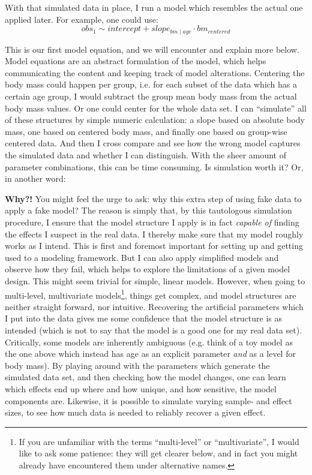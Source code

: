 With that simulated data in place, I run a model which resembles the actual one applied later.
For example, one could use:
\begin{equation} obs_{1} \sim intercept + slope_{bm\mid age} \cdot bm_{centered} \label{eq:exampleformula} \end{equation}

This is our first model equation, and we will encounter and explain more below.
Model equations are an abstract formulation of the model, which helps communicating the content and keeping track of model alterations.
Centering the body mass could happen per group, i.e. for each subset of the data which has a certain age group, I would subtract the group mean body mass from the actual body mass values.
Or one could center for the whole data set.
I can ``simulate'' all of these structures by simple numeric calculation: a slope based on absolute body mass, one based on centered body mass, and finally one based on group-wise centered data.
And then I cross compare and see how the wrong model captures the simulated data and whether I can distinguish.
With the sheer amount of parameter combinations, this can be time consuming.
Is simulation worth it? Or, in another word:

\textbf{Why?!} You might feel the urge to ask: why this extra step of using fake data to apply a fake model?
The reason is simply that, by this tautologous simulation procedure, I ensure that the model structure I apply is in fact \emph{capable of} finding the effects I suspect in the real data.
I thereby make sure that my model roughly works as I intend.
This is first and foremost important for setting up and getting used to a modeling framework.
But I can also apply simplified models and observe how they fail, which helps to explore the limitations of a given model design.
This might seem trivial for simple, linear models.
However, when going to multi-level, multivariate models\footnote{If you are unfamiliar with the terms ``multi-level'' or ``multivariate'', I would like to ask some patience: they will get clearer below, and in fact you might already have encountered them under alternative names.}, things get complex, and model structures are neither straight forward, nor intuitive.
Recovering the artificial parameters which I put into the data gives me some confidence that the model structure is as intended (which is not to say that the model is a good one for my real data set).
Critically, some models are inherently ambiguous (e.g. think of a toy model as the one above which instead has age as an explicit parameter \emph{and} as a level for body mass).
By playing around with the parameters which generate the simulated data set, and then checking how the model changes, one can learn which effects end up where and how unique, and how sensitive, the model components are.
Likewise, it is possible to simulate varying sample- and effect sizes, to see how much data is needed to reliably recover a given effect.

